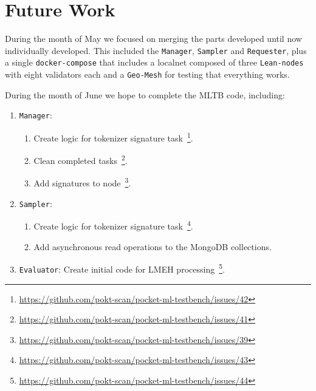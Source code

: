 \section{Future Work}\label{sec:z}

During the month of May we focused on merging the parts developed until now individually developed. 
This included the \texttt{Manager}, \texttt{Sampler} and \texttt{Requester}, plus a single \texttt{docker-compose} that includes a localnet composed of three \texttt{Lean-nodes} with eight validators each and a \texttt{Geo-Mesh} for testing that everything works. 

During the month of June we hope to complete the \gls{MLTB} code, including:
\begin{enumerate}
    \item \texttt{Manager}:
    \begin{enumerate}
        \item Create logic for tokenizer signature task~\footnote{\url{https://github.com/pokt-scan/pocket-ml-testbench/issues/42}}. 
        \item Clean completed tasks~\footnote{\url{https://github.com/pokt-scan/pocket-ml-testbench/issues/41}}. 
        \item Add signatures to node~\footnote{\url{https://github.com/pokt-scan/pocket-ml-testbench/issues/39}}. 
    \end{enumerate}

    \item \texttt{Sampler}:
    \begin{enumerate}
        \item Create logic for tokenizer signature task~\footnote{\url{https://github.com/pokt-scan/pocket-ml-testbench/issues/43}}. 
        \item Add asynchronous read operations to the MongoDB collections. 
    \end{enumerate}
    
    \item \texttt{Evaluator}: Create initial code for LMEH processing~\footnote{\url{https://github.com/pokt-scan/pocket-ml-testbench/issues/44}}. 

\end{enumerate}    
